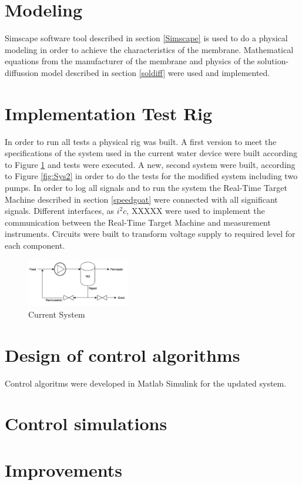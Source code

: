 \section{Modeling}
Simscape software tool described in section \ref{Simscape} is used to do a physical modeling in order to achieve the characteristics of the membrane. Mathematical equations from the manufacturer of the membrane and physics of the solution-diffussion model described in section \ref{soldiff} were used and implemented.

\section{Implementation Test Rig}
In order to run all tests a physical rig was built. A first version to meet the specifications of the system used in the current water device were built according to Figure \ref{fig:Sys1} and tests were executed.
A new, second system were built, according to Figure \ref{fig:Sys2} in order to do the tests for the modified system including two pumps. In order to log all signals and to run the system the Real-Time Target Machine described in section \ref{speedgoat} were connected with all significant signals.
Different interfaces, as $i^{2}c$, XXXXX were used to implement the communication between the Real-Time Target Machine and measurement instruments. Circuits were built to transform voltage supply to required level for each component. 

\begin{figure}[h]
    \centering
    \includegraphics[width=0.4\textwidth]{Sys1}
    \caption{Current System}
    \label{fig:Sys1}
\end{figure}


\section{Design of control algorithms}
Control algoritms were developed in Matlab Simulink for the updated system. 

\section{Control simulations}





\section{Improvements}

